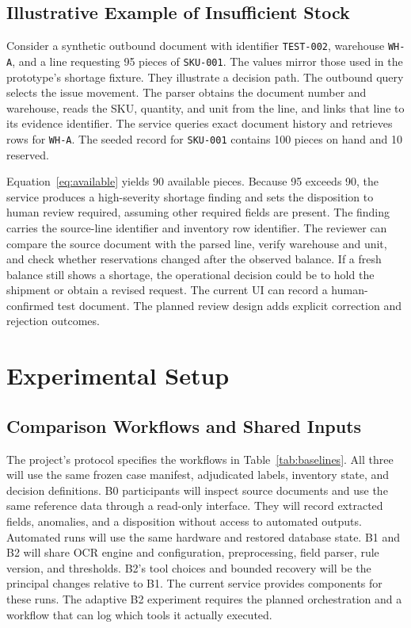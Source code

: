 \documentclass[conference]{IEEEtran}
\begin{document}
\subsection{Illustrative Example of Insufficient Stock}
Consider a synthetic outbound document with identifier \texttt{TEST-002}, warehouse \texttt{WH-A}, and a line requesting 95 pieces of \texttt{SKU-001}. The values mirror those used in the prototype's shortage fixture. They illustrate a decision path. The outbound query selects the issue movement. The parser obtains the document number and warehouse, reads the SKU, quantity, and unit from the line, and links that line to its evidence identifier. The service queries exact document history and retrieves rows for \texttt{WH-A}. The seeded record for \texttt{SKU-001} contains 100 pieces on hand and 10 reserved.

Equation~\eqref{eq:available} yields 90 available pieces. Because 95 exceeds 90, the service produces a high-severity shortage finding and sets the disposition to human review required, assuming other required fields are present. The finding carries the source-line identifier and inventory row identifier. The reviewer can compare the source document with the parsed line, verify warehouse and unit, and check whether reservations changed after the observed balance. If a fresh balance still shows a shortage, the operational decision could be to hold the shipment or obtain a revised request. The current UI can record a human-confirmed test document. The planned review design adds explicit correction and rejection outcomes.

\section{Experimental Setup}
\subsection{Comparison Workflows and Shared Inputs}
The project's protocol specifies the workflows in Table~\ref{tab:baselines}. All three will use the same frozen case manifest, adjudicated labels, inventory state, and decision definitions. B0 participants will inspect source documents and use the same reference data through a read-only interface. They will record extracted fields, anomalies, and a disposition without access to automated outputs. Automated runs will use the same hardware and restored database state. B1 and B2 will share OCR engine and configuration, preprocessing, field parser, rule version, and thresholds. B2's tool choices and bounded recovery will be the principal changes relative to B1. The current service provides components for these runs. The adaptive B2 experiment requires the planned orchestration and a workflow that can log which tools it actually executed.
\end{document}
